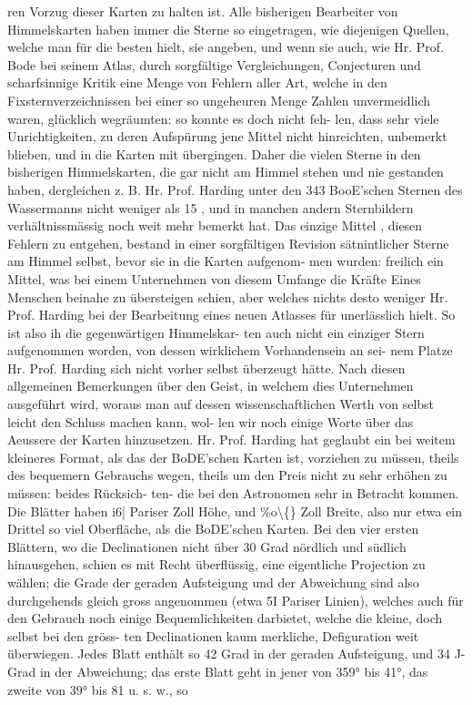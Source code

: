 \documentclass[12pt,a4paper]{article}
\begin{document}
ren  Vorzug  dieser  Karten  zu  halten  ist.  Alle  bisherigen  Bearbeiter  von  Himmelskarten  haben  immer die  Sterne  so  eingetragen,  wie  diejenigen  Quellen,  welche  man  für  die  besten  hielt,  sie  angeben,  und wenn  sie  auch,  wie  Hr.  Prof.  Bode  bei  seinem  Atlas,  durch  sorgfältige  Vergleichungen,  Conjecturen  und scharfsinnige  Kritik  eine  Menge  von  Fehlern  aller  Art,  welche  in  den  Fixsternverzeichnissen  bei  einer so  ungeheuren  Menge  Zahlen  unvermeidlich  waren,  glücklich  wegräumten:  so  konnte  es  doch  nicht  feh- len, dass  sehr  viele  Unrichtigkeiten,  zu  deren  Aufspürung  jene  Mittel  nicht  hinreichten,  unbemerkt blieben,  und  in  die  Karten  mit  übergingen.  Daher  die  vielen  Sterne  in  den  bisherigen  Himmelskarten, die  gar  nicht  am  Himmel  stehen  und  nie  gestanden  haben,  dergleichen  z.  B.  Hr.  Prof.  Harding  unter den  343  BooE'schen  Sternen  des  Wassermanns  nicht  weniger  als  15 ,  und  in  manchen  andern  Sternbildern verhältnissmässig  noch  weit  mehr  bemerkt  hat.  Das  einzige  Mittel ,  diesen  Fehlern  zu  entgehen,  bestand in  einer  sorgfältigen  Revision  sätnintlicher  Sterne  am  Himmel  selbst,  bevor  sie  in  die  Karten  aufgenom- men wurden:  freilich  ein  Mittel,  was  bei  einem  Unternehmen  von  diesem  Umfange  die  Kräfte  Eines Menschen  beinahe  zu  übersteigen  schien,  aber  welches  nichts  desto  weniger  Hr.  Prof.  Harding  bei  der Bearbeitung  eines  neuen  Atlasses  für  unerlässlich  hielt.  So  ist  also  ih  die  gegenwärtigen  Himmelskar- ten auch  nicht  ein  einziger  Stern  aufgenommen  worden,  von  dessen  wirklichem  Vorhandensein  an  sei- nem Platze  Hr.  Prof.  Harding  sich  nicht  vorher  selbst  überzeugt  hätte. Nach  diesen  allgemeinen  Bemerkungen  über  den  Geist,  in  welchem  dies  Unternehmen  ausgeführt wird,  woraus  man  auf  dessen  wissenschaftlichen  Werth  von  selbst  leicht  den  Schluss  machen  kann,  wol- len wir  noch  einige  Worte  über  das  Aeussere  der  Karten  hinzusetzen.  Hr.  Prof.  Harding  hat  geglaubt ein  bei  weitem  kleineres  Format,  als  das  der  BoDE'schen  Karten  ist,  vorziehen  zu  müssen,  theils  des bequemern  Gebrauchs  wegen,  theils  um  den  Preis  nicht  zu  sehr  erhöhen  zu  müssen:  beides  Rücksich- ten- die  bei  den  Astronomen  sehr  in  Betracht  kommen.  Die  Blätter  haben  i6|  Pariser  Zoll  Höhe,  und \%o\textbackslash\{\}  Zoll  Breite,  also  nur  etwa  ein  Drittel  so  viel  Oberfläche,  als  die  BoDE'schen  Karten.  Bei  den  vier ersten  Blättern,  wo  die  Declinationen  nicht  über  30  Grad  nördlich  und  südlich  hinausgehen,  schien  es mit  Recht  überflüssig,  eine  eigentliche  Projection  zu  wählen;  die  Grade  der  geraden  Aufsteigung  und der  Abweichung  sind  also  durchgehends  gleich  gross  angenommen  (etwa  5I  Pariser  Linien),  welches  auch für  den  Gebrauch  noch  einige  Bequemlichkeiten  darbietet,  welche  die  kleine,  doch  selbst  bei  den  gröss- ten  Declinationen  kaum  merkliche,  Defiguration  weit  überwiegen.  Jedes  Blatt  enthält  so  42  Grad  in der  geraden  Aufsteigung,  und  34 J-  Grad  in  der  Abweichung;  das  erste  Blatt  geht  in  jener  von  359°  bis 41°,  das  zweite  von  39°  bis  81  u.  s.  w.,  so  
\end{document}
